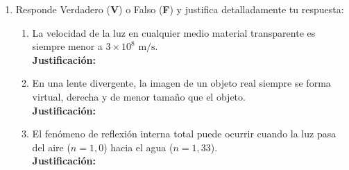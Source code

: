 \documentclass[11pt, letterpaper]{article}
\newif\ifshowanswers
\newcommand{\answer}[1]{ 
	\ifshowanswers 
	\par\vspace{0.15cm} 
	\begin{tcolorbox}[colback=blue!5!white, colframe=blue!60!white, arc=1mm, boxrule=0.5pt, title=\textbf{\footnotesize SOLUCIÓN PASO A PASO (DOCENTE)}] 
		\color{blue!80!black}\footnotesize #1 
	\end{tcolorbox} 
	\par\vspace{0.15cm} 
	\else 
	\par\vspace{0.3cm} 
	\fi 
}
\begin{document}
\begin{enumerate}[leftmargin=*, itemsep=0.8cm]
		\item  Responde Verdadero (\textbf{V}) o Falso (\textbf{F}) y justifica detalladamente tu respuesta: 
		\begin{enumerate}[label=\alph*), itemsep=0.4cm] 
			\item \underline{\hspace{1.2cm}} La velocidad de la luz en cualquier medio material transparente es siempre menor a $3 \times 10^8\text{ m/s}$.\\ 
			\textbf{Justificación:} \underline{\hspace{13.8cm}}\\ 
			\underline{\hspace{15.3cm}} 
			\item \underline{\hspace{1.2cm}} En una lente divergente, la imagen de un objeto real siempre se forma virtual, derecha y de menor tamaño que el objeto.\\ 
			\textbf{Justificación:} \underline{\hspace{13.8cm}}\\ 
			\underline{\hspace{15.3cm}} 
			\item \underline{\hspace{1.2cm}} El fenómeno de reflexión interna total puede ocurrir cuando la luz pasa del aire ($n=1,0$) hacia el agua ($n=1,33$).\\ 
			\textbf{Justificación:} \underline{\hspace{13.8cm}}\\ 
			\underline{\hspace{15.3cm}} 
		\end{enumerate} 
		\answer{ 
			a) \textbf{V}. De acuerdo con la relatividad y la electrodinámica, la velocidad máxima $c = 3 \times 10^8\text{ m/s}$ solo se alcanza en el vacío. En cualquier medio transparente $n > 1$, de modo que $v = c/n < c$.\\[0.1cm] 
			b) \textbf{V}. Para cualquier posición de un objeto real frente a una lente divergente, las prolongaciones de los rayos refractados forman una imagen virtual, derecha y reducida.\\[0.1cm] 
			c) \textbf{F}. La reflexión interna total requiere que la luz pase de un medio de mayor índice de refracción a uno de menor índice ($n_1 > n_2$). Del aire al agua ($n_1 < n_2$) siempre hay refracción hacia la normal. 
		} 
		
	\end{enumerate} 

	
\end{document}
